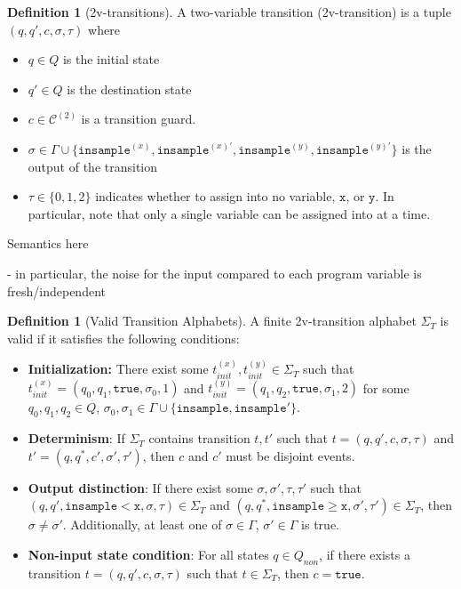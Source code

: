 \documentclass[12pt]{article}
\newcommand{\gguard}[1][x]{\texttt{insample}\geq #1}
\newcommand{\lguard}[1][x]{\texttt{insample} < #1}
\theoremstyle{definition}
\newtheorem{defn}[thm]{Definition}
\begin{document}
\begin{defn}[2v-transitions]
    A two-variable transition (2v-transition) is a tuple $(q, q', c, \sigma, \tau)$ where \begin{itemize}
        \item $q\in Q$ is the initial state
        \item $q'\in Q$ is the destination state
        \item $c\in\mathcal{C}^{(2)}$ is a transition guard.
        \item $\sigma\in\Gamma\cup\{\texttt{insample}^{(x)}, \texttt{insample}^{(x)\prime}, \texttt{insample}^{(y)}, \texttt{insample}^{(y)\prime}\}$ is the output of the transition
        \item $\tau \in \{0, 1, 2\}$ indicates whether to assign into no variable, $\texttt{x}$, or $\texttt{y}$. In particular, note that only a single variable can be assigned into at a time. 
    \end{itemize}
\end{defn}

{\color{red} Semantics here}

- in particular, the noise for the input compared to each program variable is fresh/independent 

\begin{defn}[Valid Transition Alphabets]
    A finite 2v-transition alphabet $\Sigma_T$ is valid if it satisfies the following conditions: 
    \begin{itemize}
        \item \textbf{Initialization:} There exist some $t_{init}^{(x)}, t_{init}^{(y)}\in \Sigma_T$ such that $t_{init}^{(x)} = (q_0, q_1, \texttt{true}, \sigma_0, 1)$ and $t_{init}^{(y)} = (q_1, q_2, \texttt{true}, \sigma_1, 2)$ for some $q_0, q_1, q_2\in Q$, $\sigma_0, \sigma_1 \in \Gamma\cup\{\texttt{insample}, \texttt{insample}'\}$. 
        \item \textbf{Determinism}: If $\Sigma_T$ contains transition $t, t'$ such that $t=(q, q', c, \sigma, \tau)$ and $t'= (q, q^*, c', \sigma', \tau')$, then $c$ and $c'$ must be disjoint events. 
        \item \textbf{Output distinction}: If there exist some $\sigma, \sigma', \tau, \tau'$ such that $(q, q', \lguard[\texttt{x}], \sigma, \tau)\in \Sigma_T$  and $(q, q^*, \gguard[\texttt{x}], \sigma', \tau') \in \Sigma_T$, then $\sigma \neq \sigma'$. Additionally, at least one of $\sigma\in \Gamma$, $\sigma'\in \Gamma$ is true.
        \item \textbf{Non-input state condition}: For all states $q\in Q_{non}$, if there exists a transition $t=(q, q', c, \sigma, \tau)$ such that $t\in \Sigma_T$, then $c = \texttt{true}$.
    \end{itemize}
\end{defn}
\end{document}
